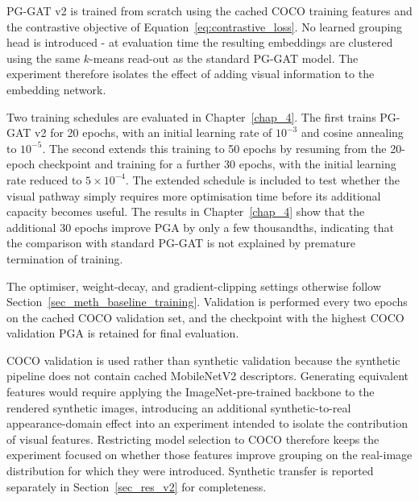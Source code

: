 PG-GAT v2 is trained from scratch using the cached COCO training
features and the contrastive objective of
Equation~\eqref{eq:contrastive_loss}.
No learned grouping head is introduced -
at evaluation time the resulting embeddings are clustered
using the same $k$-means read-out as the standard PG-GAT model.
The experiment therefore isolates the effect of adding visual information
to the embedding network.

Two training schedules are evaluated in Chapter~\ref{chap_4}.
The first trains PG-GAT v2 for 20 epochs,
with an initial learning rate of $10^{-3}$
and cosine annealing to $10^{-5}$.
The second extends this training to 50 epochs
by resuming from the 20-epoch checkpoint
and training for a further 30 epochs,
with the initial learning rate reduced to $5\times10^{-4}$.
The extended schedule is included to test whether the visual pathway
simply requires more optimisation time
before its additional capacity becomes useful.
The results in Chapter~\ref{chap_4} show that the additional 30 epochs
improve PGA by only a few thousandths,
indicating that the comparison with standard PG-GAT
is not explained by premature termination of training.

The optimiser,
weight-decay,
and gradient-clipping settings otherwise follow
Section~\ref{sec_meth_baseline_training}.
Validation is performed every two epochs
on the cached COCO validation set,
and the checkpoint with the highest COCO validation PGA
is retained for final evaluation.

COCO validation is used rather than synthetic validation
because the synthetic pipeline does not contain
cached MobileNetV2 descriptors.
Generating equivalent features would require applying
the ImageNet-pre-trained backbone to the rendered synthetic images,
introducing an additional synthetic-to-real appearance-domain effect
into an experiment intended to isolate the contribution of visual features.
Restricting model selection to COCO therefore keeps the experiment
focused on whether those features improve grouping
on the real-image distribution for which they were introduced.
Synthetic transfer is reported separately in
Section~\ref{sec_res_v2} for completeness.